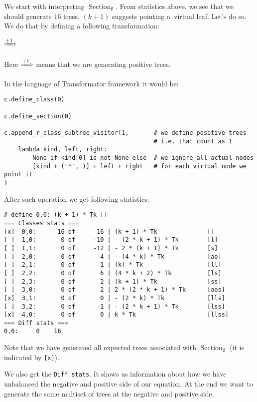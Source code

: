 \documentclass[final]{article}
\theoremstyle{definition}
\theoremstyle{definition}
\theoremstyle{remark}
\DeclareMathOperator{\tSection}{\text{Section}}
\newcommand{\includeinlinescaledsvg}[3]{\begin{minipage}{#1\textwidth}\begin{center}\end{center}\end{minipage}}
\begin{document}
We start with interpreting \(\tSection_\emptyset\). From statistics above, we see that we should generate \(16\) trees. \((k + 1)\) suggests pointing a~virtual leaf. Let's do so. We do that by defining a following transformation:

\begin{center}
    \includeinlinescaledsvg{.4}{.7}{lambda__transformations__001a}%
    \(\xRightarrow{+1}\)%
    \includeinlinescaledsvg{.4}{.7}{lambda__transformations__001b}%
\end{center}

Here \(\xRightarrow{+1}\) means that we are generating positive trees.

In the language of Transformator framework it would be:

\begin{lstlisting}
c.define_class(0)

c.define_section(0)

c.append_r_class_subtree_visitor(1,       # we define positive trees
                                          # i.e. that count as 1
    lambda kind, left, right:
        None if kind[0] is not None else  # we ignore all actual nodes
        [kind + ("*", )] + left + right   # for each virtual node we point it
)
\end{lstlisting}

After such operation we get following statistics:

\begin{lstlisting}
# define 0,0: (k + 1) * Tk []
=== Classes stats ===
[x]  0,0:      16 of      16 | (k + 1) * Tk              []
[ ]  1,0:       0 of     -10 | - (2 * k + 1) * Tk        [l]
[ ]  1,1:       0 of     -12 | - 2 * (k + 1) * Tk        [s]
[ ]  2,0:       0 of      -4 | - (4 * k) * Tk            [ao]
[ ]  2,1:       0 of       1 | (k) * Tk                  [ll]
[ ]  2,2:       0 of       6 | (4 * k + 2) * Tk          [ls]
[ ]  2,3:       0 of       2 | (k + 1) * Tk              [ss]
[ ]  3,0:       0 of       2 | 2 * (2 * k + 1) * Tk      [aos]
[x]  3,1:       0 of       0 | - (2 * k) * Tk            [lls]
[ ]  3,2:       0 of      -1 | - (2 * k + 1) * Tk        [lss]
[x]  4,0:       0 of       0 | k * Tk                    [llss]
=== Diff stats ===
0,0:     0    16
\end{lstlisting}

Note that we have generated all expected trees associated with \(\tSection_\emptyset\) (it is indicated by \verb|[x]|).

We also get the \verb|Diff stats|. It shows us information about how we have unbalanced the negative and positive side of our equation. At the end we want to generate the same multiset of trees at the negative and positive side.
\end{document}

